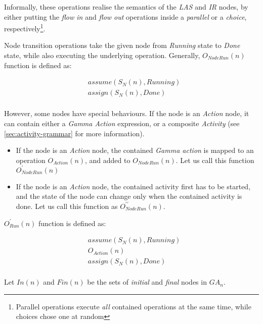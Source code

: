 Informally, these operations realise the semantics of the \emph{LAS} and \emph{IR} nodes, by either putting the \emph{flow in} and \emph{flow out} operations inside a \emph{parallel} or a \emph{choice}, respectively\footnote{Parallel operations execute \emph{all} contained operations at the same time, while choices chose one at random}.

\begin{definition}
	Node transition operations take the given node from \emph{Running} state to \emph{Done} state, while also executing the underlying operation. Generally, \(O_\mathit{NodeRun}(n)\) function is defined as:
	
	\begin{align*}
		&\mathit{assume}(S_N(n), \mathit{Running}) \\
		&\mathit{assign}(S_N(n), \mathit{Done}) \\
	\end{align*}

	However, some nodes have special behaviours. If the node is an \emph{Action} node, it can contain either a \emph{Gamma Action} expression, or a composite \emph{Activity} (see \autoref{sec:activity-grammar} for more information).

	\begin{itemize}
		\item If the node is an \emph{Action} node, the contained \emph{Gamma action} is mapped to an operation \(O_\mathit{Action}(n)\), and added to \( O_\mathit{NodeRun}(n) \). Let us call this function \(O_\mathit{NodeRun}^\prime(n)\)
		\item If the node is an \emph{Action} node, the contained activity first has to be started, and the state of the node can change only when the contained activity is done. Let us call this function as \(O_\mathit{NodeRun}^{\prime\prime}(n)\).
	\end{itemize}

	\(O_\mathit{Run}^\prime(n)\) function is defined as:
	
	\begin{align*}
		&\mathit{assume}(S_N(n), \mathit{Running}) \\
		&O_\mathit{Action}(n) \\
		&\mathit{assign}(S_N(n), \mathit{Done}) \\
	\end{align*}

	Let \(\mathit{In}(n)\) and \(\mathit{Fin}(n)\) be the sets of \emph{initial} and \emph{final} nodes in \(\mathit{GA}_\mathit{n}\). 
	

\end{definition}
